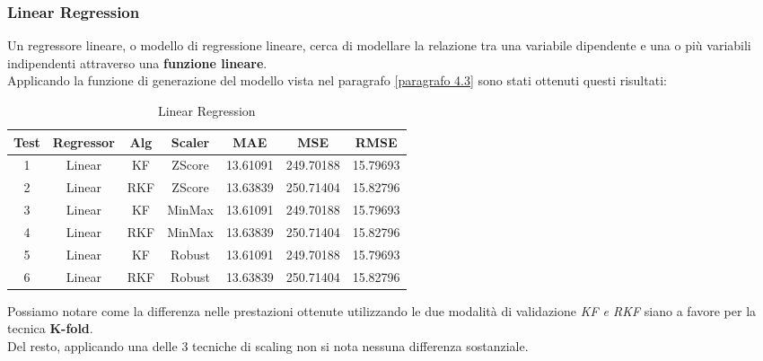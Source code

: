 \subsubsection{Linear Regression}
\fancyhead[]{}

Un regressore lineare, o modello di regressione lineare, cerca di modellare la relazione tra una variabile dipendente e una o più variabili indipendenti attraverso una \textbf{funzione lineare}. \\
Applicando la funzione di generazione del modello vista nel paragrafo \ref{paragrafo 4.3} sono stati ottenuti questi risultati:
\begin{table}[!htbp]
    \centering
    \caption{Linear Regression}
    \begin{tabular}{|c|c|c|c|c|c|c|}
        \hline
        Test & Regressor & Alg & Scaler & MAE & MSE & RMSE \\
        \hline
        1 & Linear & KF & ZScore & 13.61091 & 249.70188 & 15.79693 \\
        \hline
        2 & Linear & RKF & ZScore & 13.63839 & 250.71404 & 15.82796 \\
        \hline
        3 & Linear & KF & MinMax & 13.61091 & 249.70188 & 15.79693 \\
        \hline
        4 & Linear & RKF & MinMax & 13.63839 & 250.71404 & 15.82796 \\
        \hline
        5 & Linear & KF & Robust & 13.61091 & 249.70188 & 15.79693 \\
        \hline
        6 & Linear & RKF & Robust & 13.63839 & 250.71404 & 15.82796 \\
        \hline
    \end{tabular}
    \label{tab:reference}
\end{table}

Possiamo notare  come la differenza nelle prestazioni ottenute utilizzando le due modalità di validazione \textit{KF e RKF} siano
a favore per la tecnica  \textbf{K-fold}. \\
Del resto, applicando una delle 3 tecniche di scaling non si nota nessuna differenza sostanziale.